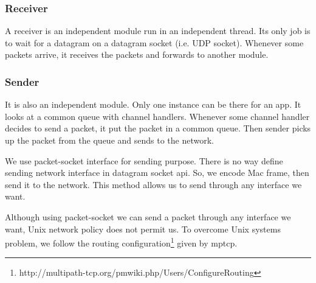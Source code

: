 \subsubsection{Receiver}
A receiver is an independent module run in an independent thread. Its only job is to wait for a datagram on a datagram socket (i.e. UDP socket). Whenever some packets arrive, it receives the packets and forwards to another module.

\subsubsection{Sender}
It is also an independent module. Only one instance can be there for an app. It looks at a common queue with channel handlers. Whenever some channel handler decides to send a packet, it put the packet in a common queue. Then sender picks up the packet from the queue and sends to the network.

We use packet-socket interface for sending purpose. There is no way define sending network interface in datagram socket \acrshort{api}. So, we encode Mac frame, then send it to the network. This method allows us to send through any interface we want.

Although using packet-socket we can send a packet through any interface we want, Unix network policy does not permit us. To overcome Unix systems problem, we follow the routing configuration\footnote{http://multipath-tcp.org/pmwiki.php/Users/ConfigureRouting} given by \acrshort{mptcp}.

